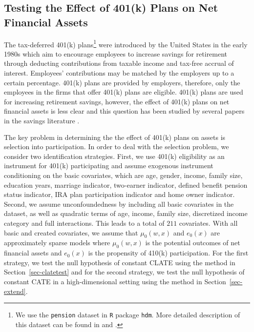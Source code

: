 \documentclass[
  12pt,
  12pt]{article}
\numberwithin{equation}{section}
\theoremstyle{definition}
\theoremstyle{plain}
\theoremstyle{plain}
\theoremstyle{remark}
\begin{document}
\subsection{Testing the Effect of 401(k) Plans on Net Financial
Assets}\label{sec-retire}

The tax-deferred 401(k) plans\footnote{We use the \texttt{pension}
  dataset in \texttt{R} package \texttt{hdm}. More detailed description
  of this dataset can be found in \citet{chernozhukov2004effects} and
  \citet{belloni2017program}.} were introduced by the United States in
the early 1980s which aim to encourage employees to increase savings for
retirement through deducting contributions from taxable income and
tax-free accrual of interest. Employees' contributions may be matched by
the employers up to a certain percentage. 401(k) plans are provided by
employers, therefore, only the employees in the firms that offer 401(k)
plans are eligible. 401(k) plans are used for increasing retirement
savings, however, the effect of 401(k) plans on net financial assets is
less clear and this question has been studied by several papers in the
savings literature
\citep[e.g][]{poterba1995401, abadie2003semiparametric, chernozhukov2004effects}.

The key problem in determining the the effect of 401(k) plans on assets
is selection into participation. In order to deal with the selection
problem, we consider two identification strategies. First, we use 401(k)
eligibility as an instrument for 401(k) participating and assume
exogenous instrument conditioning on the basic covariates, which are
age, gender, income, family size, education years, marriage indicator,
two-earner indicator, defined benefit pension status indicator, IRA plan
participation indicator and home owner indicator. Second, we assume
unconfoundedness by including all basic covariates in the dataset, as
well as quadratic terms of age, income, family size, discretized income
category and full interactions. This leads to a total of \(211\)
covariates. With all basic and created covariates, we assume that
\(\mu_0(w, x)\) and \(e_0(x)\) are approximately sparse models where
\(\mu_0(w, x)\) is the potential outcomes of net financial assets and
\(e_0(x)\) is the propensity of 410(k) participation. For the first
strategy, we test the null hypothesis of constant CLATE using the method
in Section~\ref{sec-clatetest} and for the second strategy, we test the
null hypothesis of constant CATE in a high-dimensional setting using the
method in Section~\ref{sec-extend}.
\end{document}
